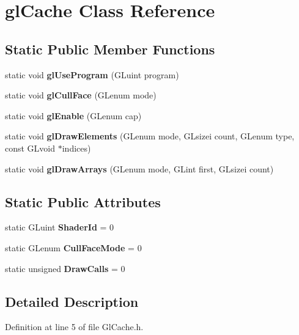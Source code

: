\hypertarget{classgl_cache}{}\section{gl\+Cache Class Reference}
\label{classgl_cache}
\subsection*{Static Public Member Functions}
\begin{DoxyCompactItemize}
\item 
static void {\bfseries gl\+Use\+Program} (G\+Luint program)\hypertarget{classgl_cache_a7788c5bc421f4fffb0c558e9613f8f14}{}\label{classgl_cache_a7788c5bc421f4fffb0c558e9613f8f14}

\item 
static void {\bfseries gl\+Cull\+Face} (G\+Lenum mode)\hypertarget{classgl_cache_ab8013e9005e6cb79a2754aa512de4dc9}{}\label{classgl_cache_ab8013e9005e6cb79a2754aa512de4dc9}

\item 
static void {\bfseries gl\+Enable} (G\+Lenum cap)\hypertarget{classgl_cache_a1388678233c21888b944fe27a3133928}{}\label{classgl_cache_a1388678233c21888b944fe27a3133928}

\item 
static void {\bfseries gl\+Draw\+Elements} (G\+Lenum mode, G\+Lsizei count, G\+Lenum type, const G\+Lvoid $\ast$indices)\hypertarget{classgl_cache_a1e84f8e987b546a678be7e2fa502af59}{}\label{classgl_cache_a1e84f8e987b546a678be7e2fa502af59}

\item 
static void {\bfseries gl\+Draw\+Arrays} (G\+Lenum mode, G\+Lint first, G\+Lsizei count)\hypertarget{classgl_cache_ae108a3ad73abd1e44ef465c291ec4830}{}\label{classgl_cache_ae108a3ad73abd1e44ef465c291ec4830}

\end{DoxyCompactItemize}
\subsection*{Static Public Attributes}
\begin{DoxyCompactItemize}
\item 
static G\+Luint {\bfseries Shader\+Id} = 0\hypertarget{classgl_cache_aff46755b94de4b4abaf376eeca078c50}{}\label{classgl_cache_aff46755b94de4b4abaf376eeca078c50}

\item 
static G\+Lenum {\bfseries Cull\+Face\+Mode} = 0\hypertarget{classgl_cache_a59fe6f35f12e7cdc8e99d559060493ca}{}\label{classgl_cache_a59fe6f35f12e7cdc8e99d559060493ca}

\item 
static unsigned {\bfseries Draw\+Calls} = 0\hypertarget{classgl_cache_aa8fd4d4ed98423ba342d3969a8082807}{}\label{classgl_cache_aa8fd4d4ed98423ba342d3969a8082807}

\end{DoxyCompactItemize}


\subsection{Detailed Description}


Definition at line 5 of file Gl\+Cache.\+h.

